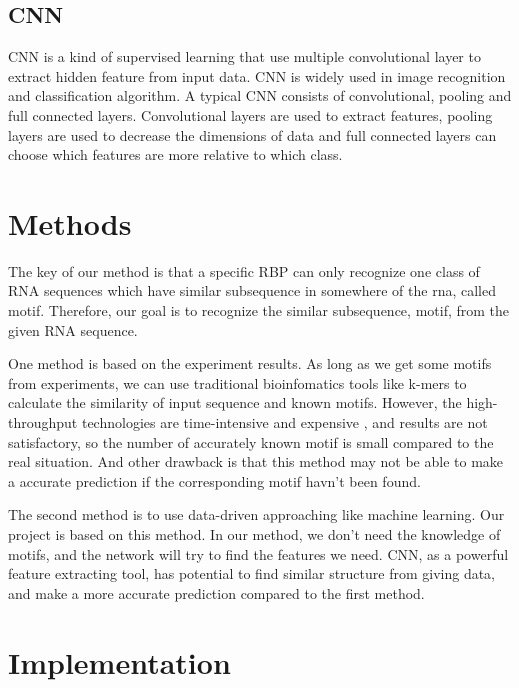 \documentclass[twoside,twocolumn]{article}
\begin{document}
    \subsection{CNN}
    
    CNN is a kind of supervised learning that use multiple convolutional layer to extract hidden feature from input data. CNN is widely used in image recognition and classification algorithm. A typical CNN consists of convolutional, pooling and full connected layers. Convolutional layers are used to extract features, pooling layers are used to decrease the dimensions of data and full connected layers can choose which features are more relative to which class.
    
\section{Methods}

The key of our method is that a specific RBP can only recognize one class of RNA sequences which have similar subsequence in somewhere of the rna, called motif. Therefore, our goal is to recognize the similar subsequence, motif, from the given RNA sequence. 

One method is based on the experiment results. As long as we get some motifs from experiments, we can use traditional bioinfomatics tools like k-mers to calculate the similarity of input sequence and known motifs. However, the high-throughput technologies are time-intensive and expensive \cite{ref1}, and results are not satisfactory, so the number of accurately known motif is small compared to the real situation. And other drawback is that this method may not be able to make a accurate prediction if the corresponding motif havn't been found.

The second method is to use data-driven approaching like machine learning. Our project is based on this method. In our method, we don't need the knowledge of motifs, and the network will try to find the features we need. CNN, as a powerful feature extracting tool, has potential to find similar structure from giving data, and make a more accurate prediction compared to the first method.
\section{Implementation}
\end{document}
